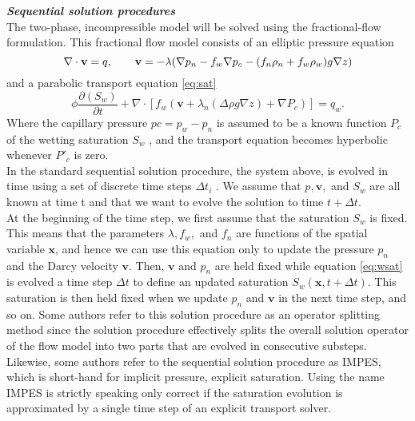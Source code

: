 \documentclass[a4paper,10pt]{report}
\begin{document}
\emph{\textbf{Sequential solution procedures}}\\
The two-phase, incompressible model will be solved using the fractional-flow formulation. This fractional flow model consists of an elliptic
pressure equation
\begin{equation}\label{eq:wdarcy}
 \nabla \cdot \mathbf{v}=q, \qquad \mathbf{v}=-\lambda(\nabla p_n-f_w\nabla p_c-(f_n \rho_n+f_w\rho_w)g\nabla z)\\
\end{equation}
and a parabolic transport equation \eqref{eq:sat}
\begin{equation}\label{eq:wsat}
 \phi\frac{\partial( {S}_{w})}{\partial t}+\nabla \cdot [f_w( \mathbf{v}+\lambda_n(\Delta  \rho g\nabla z)+\nabla P_c)]= q_w.
\end{equation}
Where the capillary pressure $pc = p_w −p_n$ is assumed to be a known function $P_c$ of the wetting saturation $S_w$ , and the transport equation becomes hyperbolic whenever $P'_c$ is zero.\\
In the standard sequential solution procedure, the system above, is
evolved in time using a set of discrete time steps $\Delta t_i$ . We assume that $p, \mathbf{v},$
and $S_w$ are all known at time t and that we want to evolve the solution to time
$t + \Delta t$.\\
At the beginning of the time step, we first assume that the saturation
$S_w$ is fixed. This means that the parameters $\lambda, f_w ,$ and $f_n$ are 
functions of the spatial variable $\mathbf{x}$, and hence we can use this equation only to update the pressure $p_n$ and the Darcy velocity $\mathbf{v}$. Then, $\mathbf{v}$ and $p_n$ are held
fixed while equation \ref{eq:wsat} is evolved a time step $\Delta t$ to define an updated saturation $S_w (\mathbf{x}, t + \Delta t)$. This saturation is then held fixed when we update $p_n$ and $\mathbf{v}$ in the next time step, and so on.
Some authors refer to this solution procedure as an operator splitting
method since the solution procedure effectively splits the overall solution operator of the flow model into two parts that are evolved in consecutive substeps.
Likewise, some authors refer to the sequential solution procedure as IMPES,
which is short-hand for implicit pressure, explicit saturation. Using the name
IMPES is strictly speaking only correct if the saturation evolution is approximated by a single time step of an explicit transport solver.\\
\end{document}
